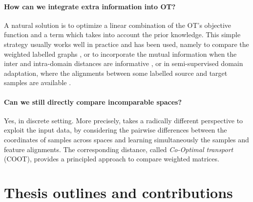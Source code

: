 \paragraph{How can we integrate extra information into OT?} A natural solution is to optimize
a linear combination of the OT's objective function and a term which takes into account the
prior knowledge. This simple strategy usually works well in practice and has been used, namely to
compare the weighted labelled graphs \citep{Vayer19b}, or to incorporate the mutual information
when the inter and intra-domain distances are informative \citep{Chuang23},
or in semi-supervised domain adaptation, where the alignments between some labelled source
and target samples are available \citep{Gu22}.


\paragraph{Can we still \textbf{directly} compare \textbf{incomparable spaces}?} Yes,
in discrete setting. More precisely, \citet{Redko20} takes a radically different perspective
to exploit the input data, by considering the pairwise differences between the coordinates
of samples across spaces and learning simultaneously the samples and feature alignments.
The corresponding distance, called \textit{Co-Optimal transport} (COOT), provides a principled approach
to compare weighted matrices.

\section{Thesis outlines and contributions}

